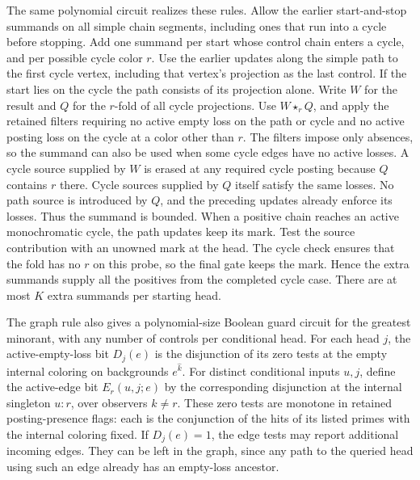 The same polynomial circuit realizes these rules. Allow
the earlier start-and-stop summands on all simple chain
segments, including ones that run into a cycle before
stopping. Add one summand per start whose control chain
enters a cycle, and per possible cycle color $r$. Use
the earlier updates along the simple path to the first
cycle vertex, including that vertex's projection as the
last control. If the start lies on the cycle the path
consists of its projection alone. Write $W$ for the
result and $Q$ for the $r$-fold of all cycle projections.
Use $W\star_r Q$, and apply the retained filters
requiring no active empty loss on the path or cycle and
no active posting loss on the cycle at a color other
than $r$. The filters impose only absences, so the
summand can also be used when some cycle edges have no
active losses. A cycle source supplied by $W$ is erased
at any required cycle posting because $Q$ contains $r$
there. Cycle sources supplied by $Q$ itself satisfy the
same losses. No path source is introduced by $Q$, and
the preceding updates already enforce its losses.
Thus the summand is bounded. When a positive chain
reaches an active monochromatic cycle, the path updates
keep its mark. Test the source contribution with an
unowned mark at the head. The cycle check ensures that
the fold has no $r$ on this probe, so the final gate
keeps the mark. Hence the extra summands supply
all the positives from the completed cycle case.
There are at most $K$ extra summands per starting head.

The graph rule also gives a polynomial-size
Boolean guard circuit for the greatest minorant,
with any number of controls per conditional head.
For each head $j$, the active-empty-loss bit
$D_j(e)$ is the disjunction of its zero tests
at the empty internal coloring on backgrounds
$e^{\widehat k}$. For distinct conditional inputs
$u,j$, define the active-edge bit $E_r(u,j;e)$
by the corresponding disjunction at the
internal singleton $u:r$, over observers
$k\ne r$. These zero tests are monotone in
retained posting-presence flags: each is the
conjunction of the hits of its listed primes
with the internal coloring fixed.
If $D_j(e)=1$, the edge tests may report
additional incoming edges. They can be left
in the graph, since any path to the queried
head using such an edge already has an
empty-loss ancestor.

